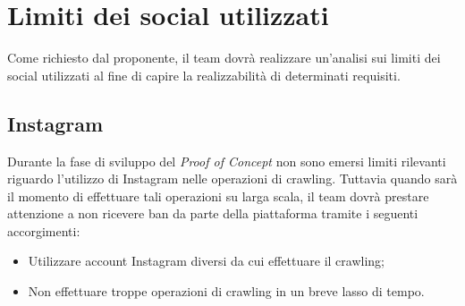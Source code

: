 \section{Limiti dei social utilizzati}
Come richiesto dal proponente, il team dovrà realizzare un'analisi sui limiti dei social utilizzati al fine di capire la realizzabilità di determinati requisiti.

\subsection{Instagram}
Durante la fase di sviluppo del \textit{Proof of Concept} non sono emersi limiti rilevanti riguardo l'utilizzo di Instagram nelle operazioni di crawling. Tuttavia quando sarà il momento di effettuare tali operazioni su larga scala, il team dovrà prestare attenzione a non ricevere ban da parte della piattaforma tramite i seguenti accorgimenti:
\begin{itemize}
    \item Utilizzare account Instagram diversi da cui effettuare il crawling;
    \item Non effettuare troppe operazioni di crawling in un breve lasso di tempo.
\end{itemize}


